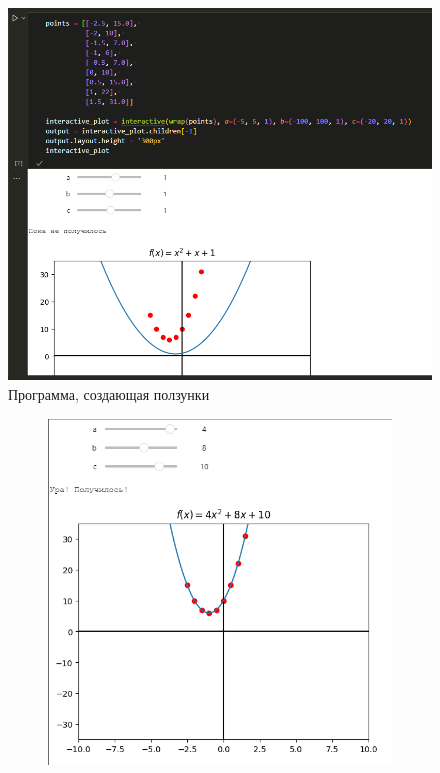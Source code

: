 \documentclass[14pt,a4paper]{extarticle}
\begin{document}
\begin{figure}[h!]
    \centering
    \includegraphics[width=0.4\linewidth]{figures//inftech//prac2/2.1.png}
    \caption{Программа, создающая ползунки}
    \label{fig:2.1-interactive}
\end{figure}

\begin{figure}[h!]
    \begin{subfigure}{.5\textwidth}
        \centering
        \includegraphics[width=0.9\linewidth]{figures//inftech//prac2/2.1-first.png}
    \end{subfigure}%
    \begin{subfigure}{.5\textwidth}
        \centering

\end{subfigure}
\end{figure}
\end{document}
